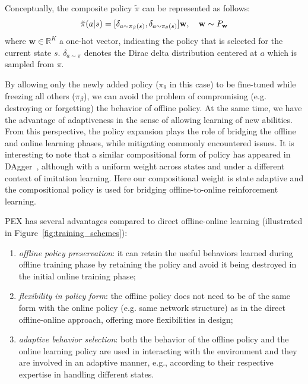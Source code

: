\documentclass{article}
\newcommand{\w}{{\mathbf{w}}}
\begin{document}
Conceptually, the composite policy $\tilde{\pi}$ can be represented  as follows:
\begin{equation}\label{eq:rex_policy}
	\vspace{-0.08in}
    \tilde{\pi}(a|s) = [\delta_{a\sim\pi_{\beta}(s)}, \delta_{a\sim\pi_{\theta}(s)}]  \w, \quad \w \sim P_{\w}
	\vspace{-0.055in}
\end{equation}
where $\w \!\in\! \mathbb{R}^{K}$ a one-hot vector, indicating the policy that is selected for the current state $s$.
$\delta_{a\sim\pi}$ denotes the Dirac delta distribution centered at $a$ which is sampled from $\pi$.

By allowing only the newly added policy ($\pi_{\theta}$ in this case) to be fine-tuned while freezing all others ($\pi_{\beta}$),
we can  avoid the problem of compromising ({e.g.}
 destroying or forgetting) the behavior of offline policy.
At the same time, we have the advantage of adaptiveness in the sense of  allowing learning of new abilities.
From this perspective, the   policy expansion plays the role of bridging the offline and online learning phases, while
mitigating commonly encountered issues.
It is interesting to note that a similar compositional form of policy has appeared in DAgger~\citep{dagger}, although with a uniform weight across states and under a different context of imitation learning. Here our compositional weight is state adaptive and the compositional policy is used for bridging offline-to-online reinforcement learning.

\vspace{-0.05in}
PEX has several advantages compared to direct offline-online learning (illustrated in Figure~\ref{fig:training_schemes}):
\vspace{-0.05in}
\begin{enumerate}[topsep=0pt,itemsep=0.5ex,partopsep=0ex,parsep=0ex]
	\item \emph{offline policy preservation}: it can retain the useful behaviors learned during offline training phase by retaining the policy and avoid it being destroyed in the initial online training phase;
	\item \emph{flexibility in policy form}: the offline policy does not need to be of the same form with the online policy ({e.g.} same network structure) as in the direct offline-online approach, offering more flexibilities in design;
	\item \emph{adaptive behavior selection}: both the behavior of the offline policy and the
	online learning policy are used in interacting with the environment and they are involved
	in an adaptive manner, {e.g.}, according to their respective expertise in handling different states.
\end{enumerate}
\end{document}
